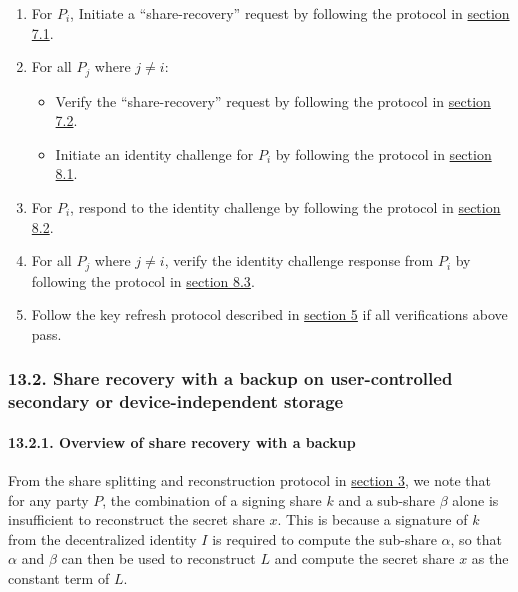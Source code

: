 \documentclass[
]{article}
\providecommand{\tightlist}{%
  \setlength{\itemsep}{0pt}\setlength{\parskip}{0pt}}
\begin{document}
\begin{enumerate}
\def\labelenumi{\arabic{enumi}.}
\tightlist
\item
  For \(P_i\), Initiate a ``share-recovery'' request by following the
  protocol in
  \protect\hyperlink{identity-authed-request-initiation}{section 7.1}.
\item
  For all \(P_j\) where \(j \neq i\):

  \begin{itemize}
  \tightlist
  \item
    Verify the ``share-recovery'' request by following the protocol in
    \protect\hyperlink{identity-authed-request-verification}{section
    7.2}.
  \item
    Initiate an identity challenge for \(P_i\) by following the protocol
    in \protect\hyperlink{identity-challenge-initiation}{section 8.1}.
  \end{itemize}
\item
  For \(P_i\), respond to the identity challenge by following the
  protocol in \protect\hyperlink{identity-challenge-response}{section
  8.2}.
\item
  For all \(P_j\) where \(j \neq i\), verify the identity challenge
  response from \(P_i\) by following the protocol in
  \protect\hyperlink{identity-challenge-verification}{section 8.3}.
\item
  Follow the key refresh protocol described in
  \protect\hyperlink{key-refresh}{section 5} if all verifications above
  pass.
\end{enumerate}

\hypertarget{share-recovery-backup}{%
\subsubsection{13.2. Share recovery with a backup on user-controlled
secondary or device-independent storage}\label{share-recovery-backup}}

\hypertarget{share-recovery-backup-overview}{%
\paragraph{13.2.1. Overview of share recovery with a
backup}\label{share-recovery-backup-overview}}

From the share splitting and reconstruction protocol in
\protect\hyperlink{share-splitting-and-reconstruction}{section 3}, we
note that for any party \(P\), the combination of a signing share \(k\)
and a sub-share \(\beta\) alone is insufficient to reconstruct the
secret share \(x\). This is because a signature of \(k\) from the
decentralized identity \(I\) is required to compute the sub-share
\(\alpha\), so that \(\alpha\) and \(\beta\) can then be used to
reconstruct \(L\) and compute the secret share \(x\) as the constant
term of \(L\).
\end{document}
